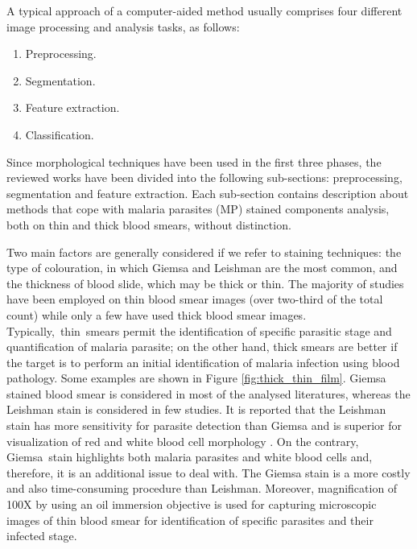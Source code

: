 \documentclass[sensors,review,accept,moreauthors,pdftex,10pt,a4paper]{mdpi}
\begin{document}
A typical approach of a computer-aided method usually comprises four different image processing and analysis tasks, as follows:
\begin{enumerate}
	\item Preprocessing.
	\item Segmentation.
	\item Feature extraction.
	\item Classification.
\end{enumerate}

Since morphological techniques have been used in the first three phases, the reviewed works have been divided into the following sub-sections: preprocessing, segmentation and feature extraction.
Each sub-section contains description about methods that cope with malaria parasites (MP) stained components analysis, both on thin and thick blood smears, without distinction.

Two main factors are generally considered if we refer to staining techniques: the type of colouration, in which Giemsa and Leishman are the most common, and the thickness of blood slide, which may be thick or thin.
The majority of studies have been employed on thin blood smear images (over two-third of the total count) while only a few have used thick blood smear images.
\mbox{Typically, thin smears} permit the identification of specific parasitic stage and quantification of malaria parasite; on the other hand, thick smears are better if the target is to perform an initial identification of malaria infection using blood pathology. Some examples are shown in Figure  \ref{fig:thick_thin_film}.
Giemsa stained blood smear is considered in most of the analysed literatures, whereas the Leishman stain is considered in few studies. %
It is reported that the Leishman stain has more sensitivity for parasite detection than Giemsa \cite{Khan2014} and is superior for visualization of red and white blood cell morphology \cite{Sathpathi2014}. On the contrary, Giemsa~stain highlights both malaria parasites and white blood cells and, therefore, it is an additional issue to deal with.
The Giemsa stain is a more costly and also time-consuming procedure than Leishman.
Moreover, magnification of 100X by using an oil immersion objective is used for capturing microscopic images of thin blood smear for identification of specific parasites and their infected stage.
\end{document}
